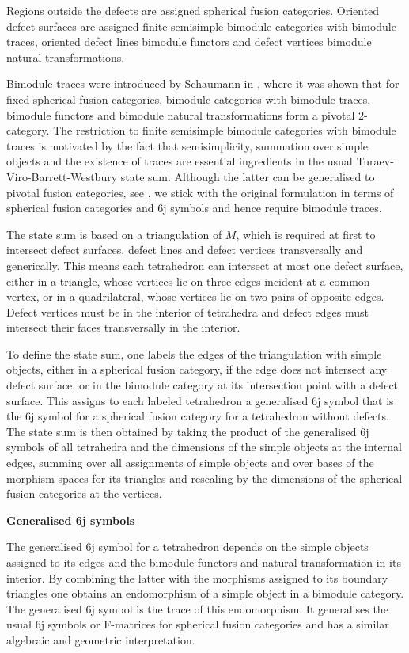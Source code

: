 \documentclass[1.5pt, a4paper]{article}
\begin{document}
Regions outside the defects are assigned spherical fusion categories.  Oriented defect surfaces are assigned  finite semisimple bimodule categories with bimodule traces, oriented defect lines bimodule functors and  defect vertices bimodule natural transformations. 

 Bimodule traces were introduced  by Schaumann in 
 \cite{G12, G14}, where it was shown that for fixed spherical fusion categories, bimodule categories with bimodule traces, bimodule functors and bimodule natural transformations form a pivotal 2-category.
The restriction to finite semisimple bimodule categories with bimodule traces is motivated by the fact that semisimplicity, summation over simple objects and the existence of traces are essential ingredients in the usual Turaev-Viro-Barrett-Westbury state sum. Although the latter can be generalised to pivotal fusion categories, see \cite{TVr,TVbook}, we stick with the original formulation in terms of spherical fusion categories  and  6j symbols and hence require bimodule traces.

The  state sum is based on a triangulation of $M$, which is required at first to intersect defect surfaces, defect lines and defect vertices transversally and generically. This means each tetrahedron  can intersect at most one defect surface,  either in a triangle, whose vertices lie on three edges incident at a common vertex, or in a quadrilateral, whose vertices lie on two pairs of opposite edges. Defect vertices must be in the interior of tetrahedra and defect edges must intersect their faces transversally in the interior. 

To define the state sum, one  labels the edges of the triangulation with simple objects, either in a spherical fusion category, if the edge does not intersect any defect surface,  or  in the bimodule category at its intersection point with a defect surface.  This assigns to each labeled tetrahedron a generalised 6j symbol that is  the 
 6j symbol for a spherical fusion category for a tetrahedron without defects. 
The state sum is then obtained by taking the product of the generalised 6j symbols of all tetrahedra  and the dimensions of the simple objects at the internal edges, summing over all  assignments of simple objects  and over bases of the morphism spaces for its triangles and rescaling by  the dimensions of the spherical fusion categories at the vertices. 

\medskip
{\bf Generalised 6j symbols}

The generalised 6j symbol for a tetrahedron depends on the simple objects assigned to its edges and the bimodule functors and natural transformation in its interior. By combining the latter with the morphisms assigned to its boundary triangles one obtains an endomorphism of a simple object in a bimodule category. The generalised 6j symbol is the trace of this endomorphism. It generalises the usual 6j symbols or F-matrices for spherical fusion categories and has a similar algebraic and geometric interpretation. 
\end{document}
